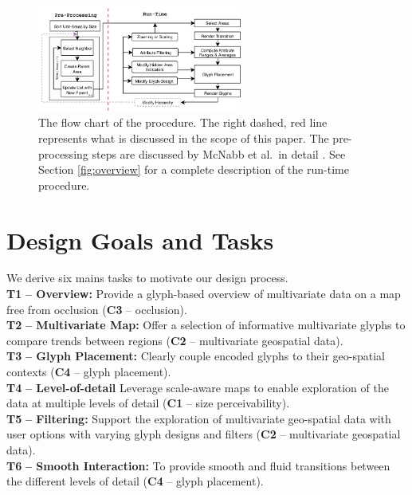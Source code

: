 \begin{figure}[t]
\centering
\includegraphics[width=0.6\textwidth]{images/ch5/HorizontalFlowv4}\vspace{-0.3cm}
\caption{The flow chart of the procedure. The right dashed, red line represents what is discussed in the scope of this paper. The pre-processing steps are discussed by McNabb et al.\ in detail \cite{mcnabb2018dynamic}. See Section \ref{fig:overview} for a complete description of the run-time procedure.} \label{fig:procedure}
\end{figure}
\section{Design Goals and Tasks} \label{sec:tasks}
We derive six mains tasks to motivate our design process. \\
\textbf{T1}\textbf{ -- Overview:} Provide a glyph-based overview of multivariate data on a map free from occlusion (\textbf{C3} -- occlusion).\\
\textbf{T2}\textbf{ -- Multivariate Map:} Offer a selection of informative multivariate glyphs to compare trends between regions (\textbf{C2} -- multivariate geospatial data).\\
\textbf{T3}\textbf{ -- Glyph Placement:} Clearly couple encoded glyphs to their geo-spatial contexts (\textbf{C4} -- glyph placement).\\
\textbf{T4}\textbf{ -- Level-of-detail} Leverage scale-aware maps to enable exploration of the data at multiple levels of detail (\textbf{C1} -- size perceivability).\\
\textbf{T5}\textbf{ -- Filtering:} Support the exploration of multivariate geo-spatial data with user options with varying glyph designs and filters (\textbf{C2} -- multivariate geospatial data).\\
\textbf{T6}\textbf{ -- Smooth Interaction:} To provide smooth and fluid transitions between the different levels of detail (\textbf{C4} -- glyph placement).
